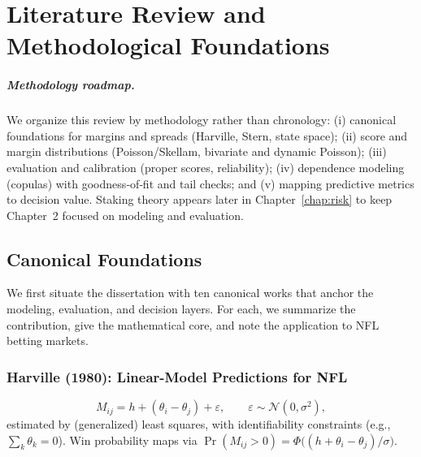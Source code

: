 \chapter{Literature Review and Methodological Foundations}
\label{chap:litreview}

\paragraph{Methodology roadmap.} We organize this review by methodology rather than chronology: (i) canonical foundations for margins and spreads (Harville, Stern, state space); (ii) score and margin distributions (Poisson/Skellam, bivariate and dynamic Poisson); (iii) evaluation and calibration (proper scores, reliability); (iv) dependence modeling (copulas) with goodness‑of‑fit and tail checks; and (v) mapping predictive metrics to decision value. Staking theory appears later in Chapter~\ref{chap:risk} to keep Chapter~2 focused on modeling and evaluation.

\section{Canonical Foundations}
We first situate the dissertation with ten canonical works that anchor the modeling, evaluation, and decision layers. For each, we summarize the contribution, give the mathematical core, and note the application to NFL betting markets.

\subsection{Harville (1980): Linear-Model Predictions for NFL} \label{subsec:harville1980}
\begin{equation}\label{eq:harville}
M_{ij} = h + (\theta_i - \theta_j) + \varepsilon,\qquad \varepsilon\sim \mathcal N(0,\sigma^2),
\end{equation}
estimated by (generalized) least squares, with identifiability constraints (e.g., $\sum_k \theta_k=0$). Win probability maps via $\Pr(M_{ij}>0)=\Phi\big((h+\theta_i-\theta_j)/\sigma\big)$.

